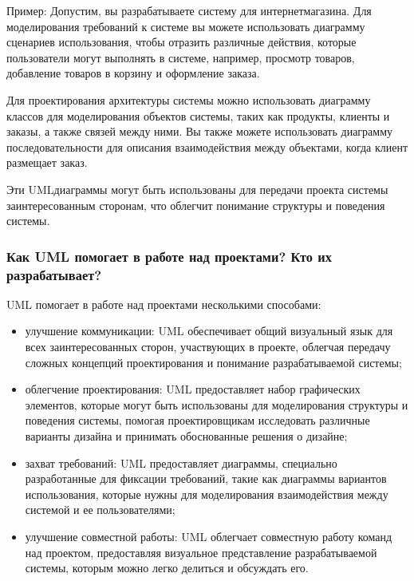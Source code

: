 \documentclass[letterpaper,10pt,russian]{sphinxmanual}
\begin{document}
\sphinxAtStartPar
Пример:
Допустим, вы разрабатываете систему для интернет\sphinxhyphen{}магазина. Для моделирования требований к системе вы можете использовать диаграмму сценариев использования, чтобы отразить различные действия, которые пользователи могут выполнять в системе, например, просмотр товаров, добавление товаров в корзину и оформление заказа.

\sphinxAtStartPar
Для проектирования архитектуры системы можно использовать диаграмму классов для моделирования объектов системы, таких как продукты, клиенты и заказы, а также связей между ними. Вы также можете использовать диаграмму последовательности для описания взаимодействия между объектами, когда клиент размещает заказ.

\sphinxAtStartPar
Эти UML\sphinxhyphen{}диаграммы могут быть использованы для передачи проекта системы заинтересованным сторонам, что облегчит понимание структуры и поведения системы.


\subsubsection{Как UML помогает в работе над проектами? Кто их разрабатывает?}
\label{\detokenize{educational_materials/uml/content:id2}}
\sphinxAtStartPar
UML помогает в работе над проектами несколькими способами:
\begin{itemize}
\item {} 
\sphinxAtStartPar
улучшение коммуникации: UML обеспечивает общий визуальный язык для всех заинтересованных сторон, участвующих в проекте, облегчая передачу сложных концепций проектирования и понимание разрабатываемой системы;

\item {} 
\sphinxAtStartPar
облегчение проектирования: UML предоставляет набор графических элементов, которые могут быть использованы для моделирования структуры и поведения системы, помогая проектировщикам исследовать различные варианты дизайна и принимать обоснованные решения о дизайне;

\item {} 
\sphinxAtStartPar
захват требований: UML предоставляет диаграммы, специально разработанные для фиксации требований, такие как диаграммы вариантов использования, которые нужны для моделирования взаимодействия между системой и ее пользователями;

\item {} 
\sphinxAtStartPar
улучшение совместной работы: UML облегчает совместную работу команд над проектом, предоставляя визуальное представление разрабатываемой системы, которым можно легко делиться и обсуждать его.

\end{itemize}
\end{document}
